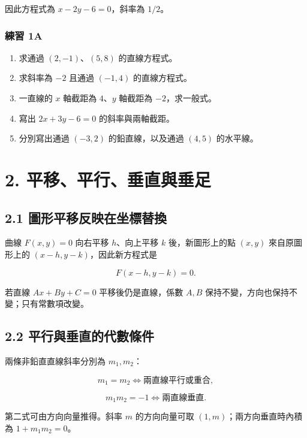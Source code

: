 \documentclass[11pt,a4paper]{article}
\providecommand{\tightlist}{%
  \setlength{\itemsep}{0pt}\setlength{\parskip}{0pt}}
\begin{document}
因此方程式為 \(\boxed{x-2y-6=0}\)，斜率為 \(\boxed{1/2}\)。

\subsubsection{練習 1A}\label{ux7df4ux7fd2-1a}

\begin{enumerate}
\def\labelenumi{\arabic{enumi}.}
\tightlist
\item
  求通過 \((2,-1)\)、\((5,8)\) 的直線方程式。
\item
  求斜率為 \(-2\) 且通過 \((-1,4)\) 的直線方程式。
\item
  一直線的 \(x\) 軸截距為 \(4\)、\(y\) 軸截距為 \(-2\)，求一般式。
\item
  寫出 \(2x+3y-6=0\) 的斜率與兩軸截距。
\item
  分別寫出通過 \((-3,2)\) 的鉛直線，以及通過 \((4,5)\) 的水平線。
\end{enumerate}

\section{2. 平移、平行、垂直與垂足}\label{ux5e73ux79fbux5e73ux884cux5782ux76f4ux8207ux5782ux8db3}

\subsection{2.1 圖形平移反映在坐標替換}\label{ux5716ux5f62ux5e73ux79fbux53cdux6620ux5728ux5750ux6a19ux66ffux63db}

曲線 \(F(x,y)=0\) 向右平移 \(h\)、向上平移 \(k\) 後，新圖形上的點 \((x,y)\) 來自原圖形上的 \((x-h,y-k)\)，因此新方程式是

\[
\boxed{F(x-h,y-k)=0}.
\]

若直線 \(Ax+By+C=0\) 平移後仍是直線，係數 \(A,B\) 保持不變，方向也保持不變；只有常數項改變。

\subsection{2.2 平行與垂直的代數條件}\label{ux5e73ux884cux8207ux5782ux76f4ux7684ux4ee3ux6578ux689dux4ef6}

兩條非鉛直直線斜率分別為 \(m_1,m_2\)：

\[
\boxed{m_1=m_2\iff\text{兩直線平行或重合}},
\]

\[
\boxed{m_1m_2=-1\iff\text{兩直線垂直}}.
\]

第二式可由方向向量推得。斜率 \(m\) 的方向向量可取 \((1,m)\)；兩方向垂直時內積為 \(1+m_1m_2=0\)。
\end{document}

